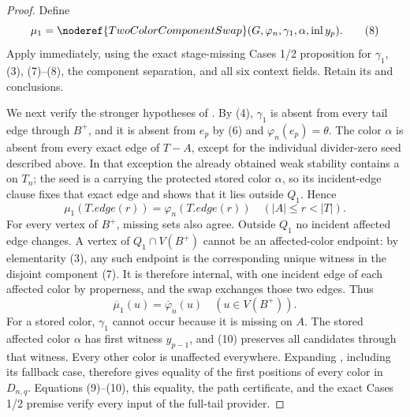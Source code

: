 \begin{proof}
Define
\[
 \mu_1=\noderef{TwoColorComponentSwap}
       (G,\varphi_n,\gamma_1,\alpha,\operatorname{inl}y_p).   \tag{8}
\]
Apply  immediately, using the exact
stage-missing Cases 1/2 proposition for \(\gamma_1\), (3), (7)--(8),
the component separation, and all six context fields.  Retain its
 and  conclusions.

We next verify the stronger hypotheses of
.  By (4), \(\gamma_1\) is
absent from every tail edge through \(B^+\), and it is absent from
\(e_p\) by (6) and \(\varphi_n(e_p)=\theta\).  The color \(\alpha\) is
absent from every exact edge of \(T-A\), except for the individual
divider-zero seed described above.  In that exception the already
obtained weak stability contains a  on \(T_n\);
the seed is a  carrying the protected stored
color \(\alpha\), so its incident-edge clause fixes that exact edge and
shows that it lies outside \(Q_1\).  Hence
\[
 \mu_1(T.\mathit{edge}(r))=\varphi_n(T.\mathit{edge}(r))
                  \quad(|A|\le r<|T|).                       \tag{9}
\]
For every vertex of \(B^+\), missing sets also agree.  Outside \(Q_1\)
no incident affected edge changes.  A vertex of \(Q_1\cap V(B^+)\)
cannot be an affected-color endpoint: by elementarity (3), any such
endpoint is the corresponding unique witness in the disjoint component
(7).  It is therefore internal, with one incident edge of each affected
color by properness, and the swap exchanges those two edges.  Thus
\[
 \overline\mu_1(u)=\overline\varphi_n(u)
                         \quad(u\in V(B^+)).                  \tag{10}
\]
For a stored color, \(\gamma_1\) cannot occur because it is missing on
\(A\).  The stored affected color \(\alpha\) has first witness
\(y_{p-1}\), and (10) preserves all candidates through that witness.
Every other color is unaffected everywhere.  Expanding
, including its fallback case,
therefore gives equality of the first positions of every color in
\(D_{n,q}\).  Equations (9)--(10), this equality, the path certificate,
and the exact Cases 1/2 premise verify every input of the full-tail
provider.


\end{proof}
